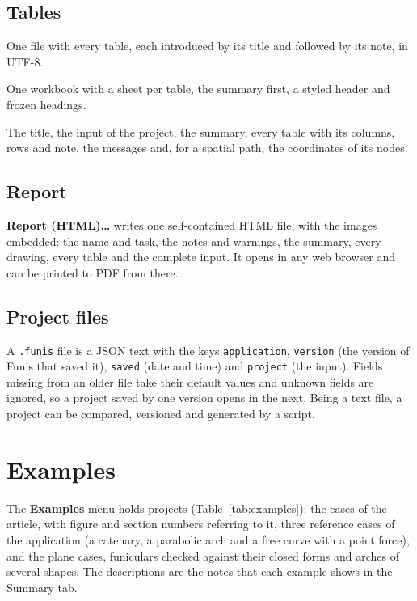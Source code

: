 \documentclass[fontsize=10.5pt,paper=a4,parskip=half,headings=normal,numbers=noenddot,
  open=any,bibliography=totoc,captions=tableheading]{scrreprt}
\numberwithin{figure}{chapter}
\numberwithin{table}{chapter}
\newcommand{\menu}[1]{{\sffamily\bfseries\color{ink}#1}}
\newcommand{\ui}[1]{{\sffamily\color{ink}#1}}
\newcommand{\file}[1]{\texttt{#1}}
\begin{document}
\section{Tables}

\begin{description}[leftmargin=0pt,labelsep=0.5em]
\item[CSV.] One file with every table, each introduced by its title and followed by its note, in UTF-8.
\item[Excel.] One workbook with a sheet per table, the summary first, a styled header and frozen
headings.
\item[JSON.] The title, the input of the project, the summary, every table with its columns, rows and
note, the messages and, for a spatial path, the coordinates of its nodes.
\end{description}

\section{Report}

\menu{Report (HTML)…} writes one self-contained HTML file, with the images embedded: the name and task,
the notes and warnings, the summary, every drawing, every table and the complete input. It opens in any
web browser and can be printed to PDF from there.

\section{Project files}

A \file{.funis} file is a JSON text with the keys \file{application}, \file{version} (the version of
Funis that saved it), \file{saved} (date and time) and \file{project} (the input). Fields missing from
an older file take their default values and unknown fields are ignored, so a project saved by one
version opens in the next. Being a text file, a project can be compared, versioned and generated by a
script.

\chapter{Examples}\label{ch:examples}

The \menu{Examples} menu holds \NumberOfExamples{} projects (Table~\ref{tab:examples}): the cases of the
article, with figure and section numbers referring to it, three reference cases of the application (a
catenary, a parabolic arch and a free curve with a point force), and the plane cases, funiculars checked
against their closed forms and arches of several shapes. The descriptions are the notes that each
example shows in the \ui{Summary} tab.
\end{document}
